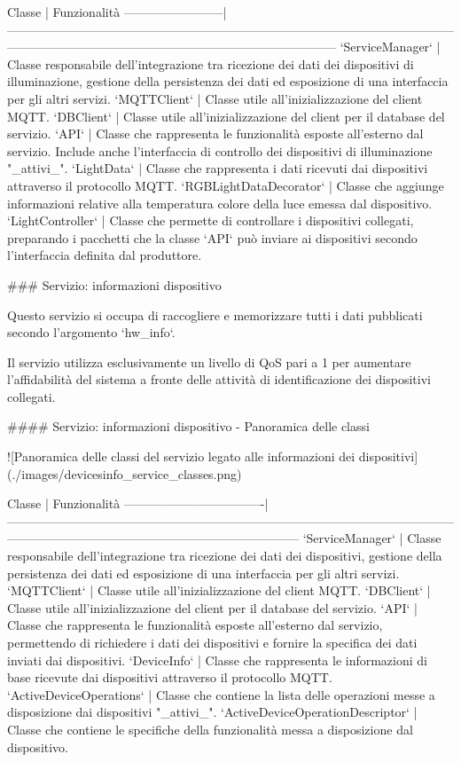 Classe                  | Funzionalità
------------------------|--------------------------------------------------------------------------------------------------------------------------------------------------------------------------------------------
`ServiceManager`        | Classe responsabile dell'integrazione tra ricezione dei dati dei dispositivi di illuminazione, gestione della persistenza dei dati ed esposizione di una interfaccia per gli altri servizi.
`MQTTClient`            | Classe utile all'inizializzazione del client MQTT.
`DBClient`              | Classe utile all'inizializzazione del client per il database del servizio.
`API`                   | Classe che rappresenta le funzionalità esposte all'esterno dal servizio. Include anche l'interfaccia di controllo dei dispositivi di illuminazione "_attivi_".
`LightData`             | Classe che rappresenta i dati ricevuti dai dispositivi attraverso il protocollo MQTT.
`RGBLightDataDecorator` | Classe che aggiunge informazioni relative alla temperatura colore della luce emessa dal dispositivo.
`LightController`       | Classe che permette di controllare i dispositivi collegati, preparando i pacchetti che la classe `API` può inviare ai dispositivi secondo l'interfaccia definita dal produttore.

### Servizio: informazioni dispositivo

Questo servizio si occupa di raccogliere e memorizzare tutti i dati pubblicati secondo l'argomento `hw_info`.

Il servizio utilizza esclusivamente un livello di QoS pari a 1 per aumentare l'affidabilità del sistema a fronte delle attività di identificazione dei dispositivi collegati.

#### Servizio: informazioni dispositivo - Panoramica delle classi

![Panoramica delle classi del servizio legato alle informazioni dei dispositivi](./images/devicesinfo_service_classes.png)

Classe                            | Funzionalità
----------------------------------|-----------------------------------------------------------------------------------------------------------------------------------------------------------------------------------
`ServiceManager`                  | Classe responsabile dell'integrazione tra ricezione dei dati dei dispositivi, gestione della persistenza dei dati ed esposizione di una interfaccia per gli altri servizi.
`MQTTClient`                      | Classe utile all'inizializzazione del client MQTT.
`DBClient`                        | Classe utile all'inizializzazione del client per il database del servizio.
`API`                             | Classe che rappresenta le funzionalità esposte all'esterno dal servizio, permettendo di richiedere i dati dei dispositivi e fornire la specifica dei dati inviati dai dispositivi.
`DeviceInfo`                      | Classe che rappresenta le informazioni di base ricevute dai dispositivi attraverso il protocollo MQTT.
`ActiveDeviceOperations`          | Classe che contiene la lista delle operazioni messe a disposizione dai dispositivi "_attivi_".
`ActiveDeviceOperationDescriptor` | Classe che contiene le specifiche della funzionalità messa a disposizione dal dispositivo.

